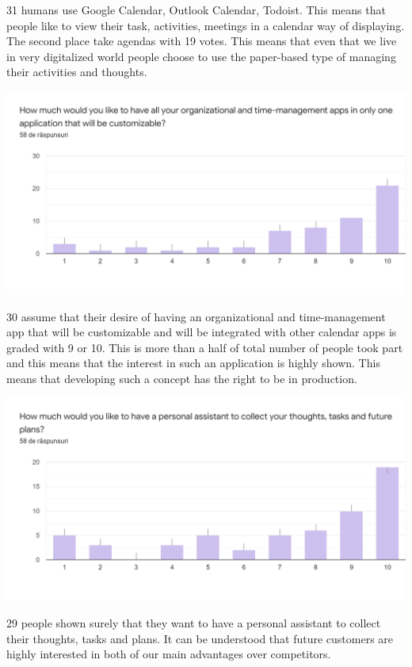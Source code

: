 \par 31 humans use Google Calendar, Outlook Calendar, Todoist. This means that people like to view their task, activities, meetings in a calendar way of displaying. The second place take agendas with 19 votes. This means that even that we live in very digitalized world people choose to use the paper-based type of managing their activities and thoughts.
\par
\includegraphics[width=\textwidth]{CustomerValidation4}
\par 30 assume that their desire of having an organizational and time-management app that will be customizable and will be integrated with other calendar apps is graded with 9 or 10. This is more than a half of total number of people took part and this means that the interest in such an application is highly shown. This means that developing such a concept has the right to be in production.
\par
\includegraphics[width=\textwidth]{CustomerValidation5}
\par 29 people shown surely that they want to have a personal assistant to collect their thoughts, tasks and plans. It can be understood that future customers are highly interested in both of our main advantages over competitors.

